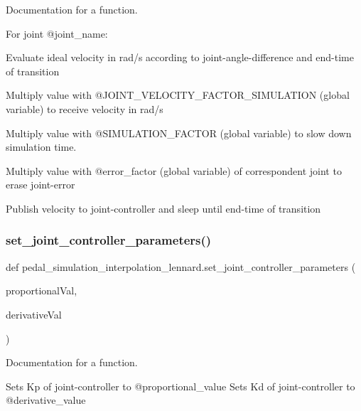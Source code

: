 Documentation for a function. 

For joint @joint\+\_\+name\+:


\begin{DoxyItemize}
\item Evaluate ideal velocity in rad/s according to joint-\/angle-\/difference and end-\/time of transition
\item Multiply value with @\+J\+O\+I\+N\+T\+\_\+\+V\+E\+L\+O\+C\+I\+T\+Y\+\_\+\+F\+A\+C\+T\+O\+R\+\_\+\+S\+I\+M\+U\+L\+A\+T\+I\+ON (global variable) to receive velocity in rad/s
\item Multiply value with @\+S\+I\+M\+U\+L\+A\+T\+I\+O\+N\+\_\+\+F\+A\+C\+T\+OR (global variable) to slow down simulation time.
\item Multiply value with @error\+\_\+factor (global variable) of correspondent joint to erase joint-\/error
\item Publish velocity to joint-\/controller and sleep until end-\/time of transition 
\end{DoxyItemize}\mbox{\label{namespacepedal__simulation__interpolation__lennard_a9df1fa4c58719674f8b9b9b8ba918f7f}} 
\subsubsection{\texorpdfstring{set\_joint\_controller\_parameters()}{set\_joint\_controller\_parameters()}}
{\footnotesize\ttfamily def pedal\+\_\+simulation\+\_\+interpolation\+\_\+lennard.\+set\+\_\+joint\+\_\+controller\+\_\+parameters (\begin{DoxyParamCaption}\item[{}]{proportional\+Val,  }\item[{}]{derivative\+Val }\end{DoxyParamCaption})}



Documentation for a function. 

Sets Kp of joint-\/controller to @proportional\+\_\+value Sets Kd of joint-\/controller to @derivative\+\_\+value \mbox{\label{namespacepedal__simulation__interpolation__lennard_a815caeaf6a6a52507b939cbaad0e676b}} 
